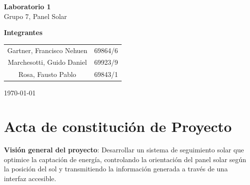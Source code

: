 \documentclass[a4paper,12pt]{article}
\begin{document}
\begin{titlepage}
    \begin{center}
        \vspace*{3cm}
        
        {\Huge \textbf{Laboratorio 1}}\\[1cm]
        {\LARGE Grupo 7, Panel Solar}\\[2cm]
        
        \vfill
        
        {\Large \textbf{Integrantes}}\\[0.5cm]
        \large
        \begin{tabular}{c c}
            Gartner, Francisco Nehuen & 69864/6 \\
            Marchesotti, Guido Daniel & 69923/9 \\
            Rosa, Fausto Pablo & 69843/1 \\
        \end{tabular}
        
        \vfill
        
        {\large \today}
    \end{center}
\end{titlepage}

\newpage
\tableofcontents
\newpage

\section{Acta de constitución de Proyecto}

\textbf{Visión general del proyecto}: Desarrollar un sistema de seguimiento solar que optimice la captación de energía, controlando la orientación del panel solar según la posición del sol y transmitiendo la información generada a través de una interfaz accesible.
\end{document}
